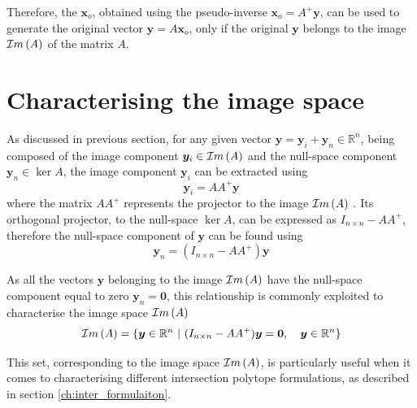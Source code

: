 Therefore, the $\bm{x}_o$, obtained using the pseudo-inverse $\bm{x}_o=A^+\bm{y}$, can be used to generate the original vector $\bm{y} = A\bm{x}_o$, only if the original $\bm{y}$ belongs to the image $\mathcal{I}m\left(A\right)$ of the matrix $A$. 



\section{Characterising the image space}
\label{ch:image_char}

As discussed in previous section, for any given vector $\bm{y} = \bm{y}_i + \bm{y}_n\in\mathbb{R}^n$, being composed of the image component $\bm{y}_i\in\mathcal{I}m\left(A\right)$ and the null-space component $\bm{y}_n\in\ker{A}$, the image component $\bm{y}_i$ can be extracted using 
\begin{equation}
    \bm{y}_i =  AA^+\bm{y}
\end{equation}
where the matrix $AA^+$ represents the projector to the image $\mathcal{I}m\left(A\right)$ \cite[p. 430]{meyer2001Matrix}. Its orthogonal projector, to the null-space $\ker{A}$, can be expressed as $I_{n\times n} - AA^+$, therefore the null-space component of $\bm{y}$ can be found using
\begin{equation}
    \bm{y}_n = (I_{n\times n} - AA^+)\bm{y}
\end{equation}

As all the vectors $\bm{y}$ belonging to the image $\mathcal{I}m\left(A\right)$ have the null-space component equal to zero $\bm{y}_n=\bm{0}$, this relationship is commonly exploited to characterise the image space $\mathcal{I}m\left(A\right)$
\begin{equation}
   \mathcal{I}m\left(A\right) = \{ \bm{y}\in\mathbb{R}^n ~|~(I_{n\times n} - AA^+)\bm{y} = \bm{0}, \quad \bm{y}\in\mathbb{R}^n \}
   \label{eq:image_poly}
\end{equation}

This set, corresponding to the image space $\mathcal{I}m\left(A\right)$, is particularly useful when it comes to characterising different intersection polytope formulations, as described in section \ref{ch:inter_formulaiton}.

